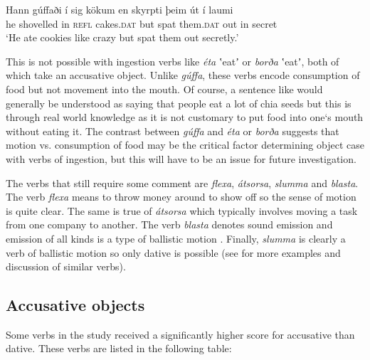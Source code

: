 \documentclass[output=paper,modfonts,nonflat]{langsci/langscibook}
\begin{document}
 
\ea%
    \label{ex:jonsson:4}
\gll     Hann   gúffaði   í   sig   kökum   en   skyrpti   þeim   út   í    laumi\\
  he   shovelled   in   \textsc{refl}   cakes.\textsc{dat}   but   spat   them\textsc{.dat}   out   in   secret\\
\glt `He ate cookies like crazy but spat them out secretly.'
\z

This is not possible with ingestion verbs like \textit{éta} ʽeatʼ or \textit{borða} ʽeatʼ, both of which take an accusative object. Unlike \textit{gúffa}, these verbs encode consumption of food but not movement into the mouth. Of course, a sentence like  would generally be understood as saying that people eat a lot of chia seeds but this is through real world knowledge as it is not customary to put food into one‘s mouth without eating it. The contrast between \textit{gúffa} and \textit{éta} or \textit{borða} suggests that motion vs. consumption of food may be the critical factor determining object case with verbs of ingestion, but this will have to be an issue for future investigation.

The verbs that still require some comment are \textit{flexa}, \textit{átsorsa}, \textit{slumma} and \textit{blasta}. The verb \textit{flexa} means to throw money around to show off so the sense of motion is quite clear. The same is true of \textit{átsorsa} which typically involves moving a task from one company to another. The verb \textit{blasta} denotes sound emission and emission of all kinds is a type of ballistic motion \citep{Jónsson2013a}. Finally, \textit{slumma} is clearly a verb of ballistic motion so only dative is possible (see \citealt{Jónsson2013a} for more examples and discussion of similar verbs).

\subsection{Accusative objects} %

Some verbs in the study received a significantly higher score for accusative than dative. These verbs are listed in the following table:  
\end{document}

